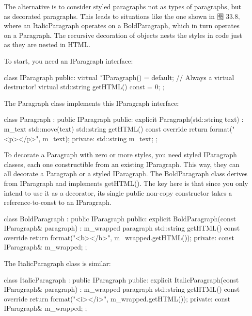 
The alternative is to consider styled paragraphs not as types of paragraphs, but as decorated paragraphs. This leads to situations like the one shown in 图 33.8, where an ItalicParagraph operates on a BoldParagraph, which in turn operates on a Paragraph. The recursive decoration of objects nests the styles in code just as they are nested in HTML.



To start, you need an IParagraph interface:

\begin{cpp}
class IParagraph
{
    public:
        virtual ˜IParagraph() = default; // Always a virtual destructor!
        virtual std::string getHTML() const = 0;
};
\end{cpp}

The Paragraph class implements this IParagraph interface:

\begin{cpp}
class Paragraph : public IParagraph
{
    public:
        explicit Paragraph(std::string text) : m_text { std::move(text) } {}
        std::string getHTML() const override {return format("<p>{}</p>", m_text); }
    private:
        std::string m_text;
};
\end{cpp}

To decorate a Paragraph with zero or more styles, you need styled IParagraph classes, each one constructible from an existing IParagraph. This way, they can all decorate a Paragraph or a styled IParagraph. The BoldParagraph class derives from IParagraph and implements getHTML(). The key here is that since you only intend to use it as a decorator, its single public non-copy constructor takes a reference-to-const to an IParagraph.

\begin{cpp}
class BoldParagraph : public IParagraph
{
    public:
        explicit BoldParagraph(const IParagraph& paragraph)
        : m_wrapped { paragraph } { }
        std::string getHTML() const override {
            return format("<b>{}</b>", m_wrapped.getHTML()); }
    private:
        const IParagraph& m_wrapped;
};
\end{cpp}

The ItalicParagraph class is similar:

\begin{cpp}
class ItalicParagraph : public IParagraph
{
    public:
        explicit ItalicParagraph(const IParagraph& paragraph)
        : m_wrapped { paragraph } { }
        std::string getHTML() const override {
            return format("<i>{}</i>", m_wrapped.getHTML()); }
    private:
        const IParagraph& m_wrapped;
};
\end{cpp}

